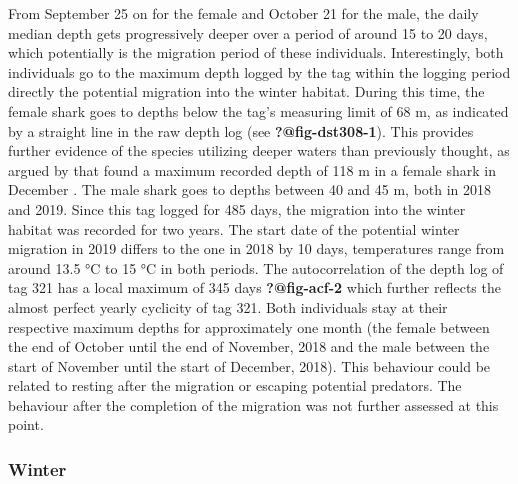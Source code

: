 \documentclass[
  authoryear,
  review,
  3p]{elsarticle}
\begin{document}
From September 25 on for the female and October 21 for the male, the
daily median depth gets progressively deeper over a period of around 15
to 20 days, which potentially is the migration period of these
individuals. Interestingly, both individuals go to the maximum depth
logged by the tag within the logging period directly the potential
migration into the winter habitat. During this time, the female shark
goes to depths below the tag's measuring limit of 68 m, as indicated by
a straight line in the raw depth log (see \textbf{?@fig-dst308-1}). This
provides further evidence of the species utilizing deeper waters than
previously thought, as argued by \citet{griffiths_2020} that found a
maximum recorded depth of 118 m in a female shark in December
\citep[S4]{griffiths_2020}. The male shark goes to depths between 40 and
45 m, both in 2018 and 2019. Since this tag logged for 485 days, the
migration into the winter habitat was recorded for two years. The start
date of the potential winter migration in 2019 differs to the one in
2018 by 10 days, temperatures range from around 13.5 °C to 15 °C in both
periods. The autocorrelation of the depth log of tag 321 has a local
maximum of 345 days \textbf{?@fig-acf-2} which further reflects the
almost perfect yearly cyclicity of tag 321. Both individuals stay at
their respective maximum depths for approximately one month (the female
between the end of October until the end of November, 2018 and the male
between the start of November until the start of December, 2018). This
behaviour could be related to resting after the migration or escaping
potential predators. The behaviour after the completion of the migration
was not further assessed at this point.

\hypertarget{sec-disc-winter}{%
\subsubsection{Winter}\label{sec-disc-winter}}
\end{document}
